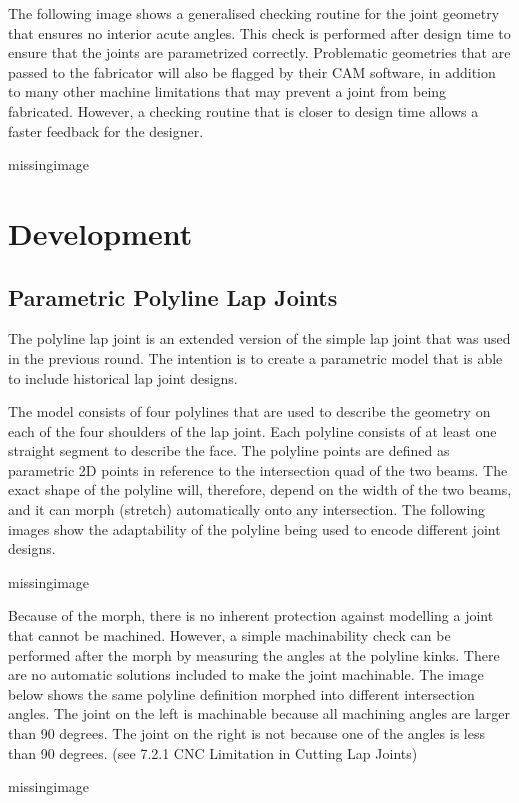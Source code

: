 The following image shows a generalised checking routine for the joint geometry that ensures no interior acute angles. This check is performed after design time to ensure that the joints are parametrized correctly. Problematic geometries that are passed to the fabricator will also be flagged by their CAM software, in addition to many other machine limitations that may prevent a joint from being fabricated. However, a checking routine that is closer to design time allows a faster feedback for the designer.

missingimage

\section{Development}
\subsection{Parametric Polyline Lap Joints}
The polyline lap joint is an extended version of the simple lap joint that was used in the previous round. The intention is to create a parametric model that is able to include historical lap joint designs.

The model consists of four polylines that are used to describe the geometry on each of the four shoulders of the lap joint. Each polyline consists of at least one straight segment to describe the face. The polyline points are defined as parametric 2D points in reference to the intersection quad of the two beams. The exact shape of the polyline will, therefore, depend on the width of the two beams, and it can morph (stretch) automatically onto any intersection. The following images show the adaptability of the polyline being used to encode different joint designs.

missingimage

Because of the morph, there is no inherent protection against modelling a joint that cannot be machined. However, a simple machinability check can be performed after the morph by measuring the angles at the polyline kinks. There are no automatic solutions included to make the joint machinable. The image below shows the same polyline definition morphed into different intersection angles. The joint on the left is machinable because all machining angles are larger than 90 degrees. The joint on the right is not because one of the angles is less than 90 degrees. (see 7.2.1 CNC Limitation in Cutting Lap Joints)

missingimage


